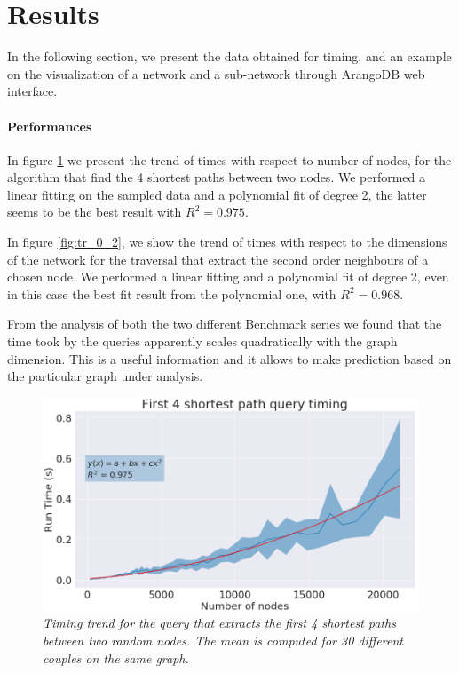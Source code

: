 \documentclass[11pt,twocolumn]{article}
\begin{document}
\section{Results}

In the following section, we present the data obtained for timing, and an example on the visualization of a network and a sub-network through ArangoDB web interface.

\paragraph{Performances}
In figure \ref{fig:sh_paths} we present the trend of times with respect to number of nodes, for the algorithm that find the 4 shortest paths between two nodes. We performed a linear fitting on the sampled data and a polynomial fit of degree 2, the latter seems to be the best result with $R^2 = 0.975$.

In figure \ref{fig:tr_0_2}, we show the trend of times with respect to the dimensions of the network for the traversal that extract the second order neighbours of a chosen node. We performed a linear fitting and a polynomial fit of degree 2, even in this case the best fit result from the polynomial one, with $R^2 = 0.968$.

From the analysis of both the two different Benchmark series we found that the time took by the queries apparently scales quadratically with the graph dimension.
This is a useful information and it allows to make prediction based on the particular graph under analysis.

\begin{figure}[ht!]
  \includegraphics[width=\linewidth]{images/4_shortest_path_timing_poly.png}
  \caption{\small{\textit{Timing trend for the query that extracts the first 4 shortest paths between two random nodes. The mean is computed for 30 different couples on the same graph.}}}
  \label{fig:sh_paths}
\end{figure}
\end{document}
